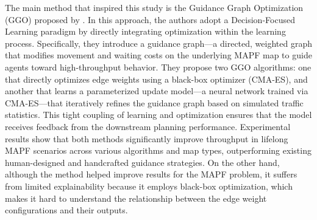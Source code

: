 The main method that inspired this study is the Guidance Graph Optimization (GGO) proposed by \cite{zhangGuidanceGraphOptimization2024}. In this approach, the authors adopt a Decision-Focused Learning paradigm by directly integrating optimization within the learning process. Specifically, they introduce a guidance graph—a directed, weighted graph that modifies movement and waiting costs on the underlying MAPF map to guide agents toward high-throughput behavior. They propose two GGO algorithms: one that directly optimizes edge weights using a black-box optimizer (CMA-ES), and another that learns a parameterized update model—a neural network trained via CMA-ES—that iteratively refines the guidance graph based on simulated traffic statistics. This tight coupling of learning and optimization ensures that the model receives feedback from the downstream planning performance. Experimental results show that both methods significantly improve throughput in lifelong MAPF scenarios across various algorithms and map types, outperforming existing human-designed and handcrafted guidance strategies. On the other hand, although the method helped improve results for the MAPF problem, it suffers from limited explainability because it employs black-box optimization, which makes it hard to understand the relationship between the edge weight configurations and their outputs.